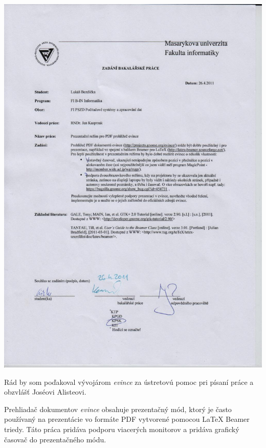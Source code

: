 \documentclass[12pt,oneside,final]{fithesis2}
\begin{document}
\FrontMatter
\ThesisTitlePage

\includegraphics[height=\textheight]{zadani.pdf}


\begin{ThesisDeclaration}
\DeclarationText
\AdvisorName
\end{ThesisDeclaration}

\begin{ThesisThanks}
Rád by som poďakoval vývojárom \emph{evince} za ústretovú pomoc pri písaní práce a obzvlášť Joséovi Alisteovi.
\end{ThesisThanks}  

\begin{ThesisAbstract}
Prehliadač dokumentov \emph{evince} obsahuje prezentačný mód, ktorý je často používaný na prezentácie vo formáte PDF vytvorené pomocou LaTeX Beamer triedy. Táto práca pridáva podporu viacerých monitorov a pridáva grafický časovač do prezentačného módu.
\end{ThesisAbstract}
\end{document}
